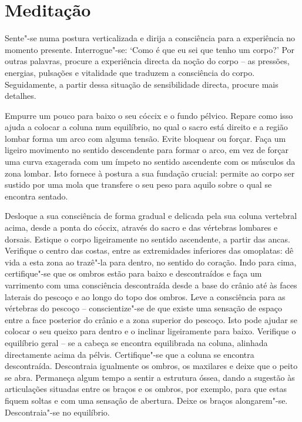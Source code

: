 
\chapter{Meditação}


Sente"-se numa postura verticalizada e dirija a consciência para a experiência no
momento presente. Interrogue"-se: `Como é que eu sei que tenho um corpo?' Por
outras palavras, procure a experiência directa da noção do corpo -- as pressões,
energias, pulsações e vitalidade que traduzem a consciência do corpo.
Seguidamente, a partir dessa situação de sensibilidade directa, procure mais
detalhes.

Empurre um pouco para baixo o seu cóccix e o fundo pélvico. Repare como isso
ajuda a colocar a coluna num equilíbrio, no qual o sacro está direito e a região
lombar forma um arco com alguma tensão. Evite bloquear ou forçar. Faça um
ligeiro movimento no sentido descendente para formar o arco, em vez de forçar
uma curva exagerada com um ímpeto no sentido ascendente com os músculos da zona
lombar. Isto fornece à postura a sua fundação crucial: permite ao corpo ser
sustido por uma mola que transfere o seu peso para aquilo sobre o qual se
encontra sentado.

Desloque a sua consciência de forma gradual e delicada pela sua coluna vertebral
acima, desde a ponta do cóccix, através do sacro e das vértebras lombares e
dorsais. Estique o corpo ligeiramente no sentido ascendente, a partir das ancas.
Verifique o centro das costas, entre as extremidades inferiores das omoplatas:
dê vida a esta zona ao trazê"-la para dentro, no sentido do coração. Indo para
cima, certifique"-se que os ombros estão para baixo e descontraídos e faça um
varrimento com uma consciência descontraída desde a base do crânio até às faces
laterais do pescoço e ao longo do topo dos ombros. Leve a consciência para as
vértebras do pescoço -- conscientize"-se de que existe uma sensação de espaço
entre a face posterior do crânio e a zona superior do pescoço. Isto pode ajudar
se colocar o seu queixo para dentro e o inclinar ligeiramente para baixo.
Verifique o equilíbrio geral -- se a cabeça se encontra equilibrada na coluna,
alinhada directamente acima da pélvis. Certifique"-se que a coluna se encontra
descontraída. Descontraia igualmente os ombros, os maxilares e deixe que o peito
se abra. Permaneça algum tempo a sentir a estrutura óssea, dando a sugestão às
articulações situadas entre os braços e os ombros, por exemplo, para que estas
fiquem soltas e com uma sensação de abertura. Deixe os braços alongarem"-se.
Descontraia"-se no equilíbrio.

